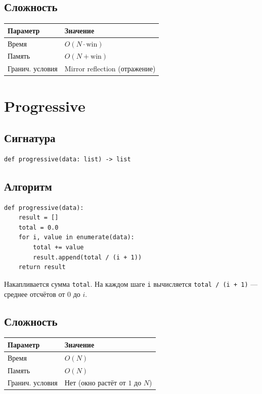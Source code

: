 \documentclass[12pt,a4paper]{article}
\begin{document}
\subsection{Сложность}

\begin{center}
\begin{tabular}{|l|l|}
\hline
\textbf{Параметр} & \textbf{Значение} \\
\hline
Время            & $O(N \cdot \text{win})$ \\
Память           & $O(N + \text{win})$ \\
Гранич. условия  & Mirror reflection (отражение) \\
\hline
\end{tabular}
\end{center}

\section{Progressive}

\subsection{Сигнатура}

\begin{lstlisting}
def progressive(data: list) -> list
\end{lstlisting}

\subsection{Алгоритм}

\begin{lstlisting}
def progressive(data):
    result = []
    total = 0.0
    for i, value in enumerate(data):
        total += value
        result.append(total / (i + 1))
    return result
\end{lstlisting}

Накапливается сумма \texttt{total}. На каждом шаге \texttt{i} вычисляется \texttt{total / (i + 1)} --- среднее отсчётов от $0$ до $i$.

\subsection{Сложность}

\begin{center}
\begin{tabular}{|l|l|}
\hline
\textbf{Параметр} & \textbf{Значение} \\
\hline
Время            & $O(N)$ \\
Память           & $O(N)$ \\
Гранич. условия  & Нет (окно растёт от $1$ до $N$) \\
\hline
\end{tabular}
\end{center}
\end{document}
